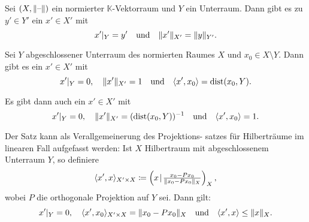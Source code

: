 \documentclass{cheat-sheet}
\newcommand{\K}{\mathbb{K}}
\newcommand{\dist}{\mathrm{dist}} %
\newcommand{\scp}[2]{\left( #1 \!\mid\! #2 \right)} %
\begin{document}
\iffalse
\begin{satz}(Hahn-Banach für lineare Funktionale)
  Sei $X$ ein $\R$-VR, $Y \subset X$ ein Unterraum, $p : X \to \R$ linear und $f : Y \to \R$ linear, sodass $f(x) \leq p(x)$ für alle $x \in Y$. Dann existiert eine lineare Abbildung $F : X \to \R$ mit $f = F|_Y \text{ und } F \leq p$.
\end{satz}
\fi

\begin{kor}
  Sei $(X, \lVert\text{--}\rVert)$ ein normierter $\K$-Vektorraum und $Y$ ein Unterraum. Dann gibt es zu $y' \in Y'$ ein $x' \in X'$ mit
  \[
    x'|_Y = y'
    \quad \text{und} \quad
    \lVert x'\rVert_{X'} = \lVert y\rVert_{Y'}.
  \]
\end{kor}

\begin{satz}
  Sei $Y$ abgeschlossener Unterraum des normierten Raumes $X$ und $x_0 \in X \setminus Y$. Dann gibt es ein $x' \in X'$ mit
  \[
    x'|_Y = 0, \quad
    \norm{x'}_{X'} = 1
    \quad \text{und} \quad
    \langle x', x_0 \rangle = \dist(x_0, Y).
  \]
\end{satz}

\begin{satz}
  Es gibt dann auch ein $x' \in X'$ mit
  \[
    x'|_Y = 0, \quad
    \norm{x'}_{X'} = (\dist(x_0, Y))^{-1}
    \quad \text{und} \quad
    \langle x', x_0 \rangle = 1.
  \]
\end{satz}

\begin{bem}
  Der Satz kann als Verallgemeinerung des Projektions- satzes für Hilberträume im linearen Fall aufgefasst werden: Ist $X$ Hilbertraum mit abgeschlossenem Unterraum $Y$, so definiere
  \[ \langle x', x \rangle_{X' {\times} X} \coloneqq \scp{x}{\tfrac{x_0 - Px_0}{\norm{x_0 - Px_0}_X}}_X, \]
  wobei $P$ die orthogonale Projektion auf $Y$ sei. Dann gilt:
  \[
    x'|_Y = 0, \quad
    \langle x', x_0 \rangle_{X' {\times} X} = \lVert x_0 - Px_0\rVert_X
    \quad \text{und} \quad
    \langle x', x \rangle \leq \lVert x\rVert_X.
  \]
\end{bem}
\end{document}
